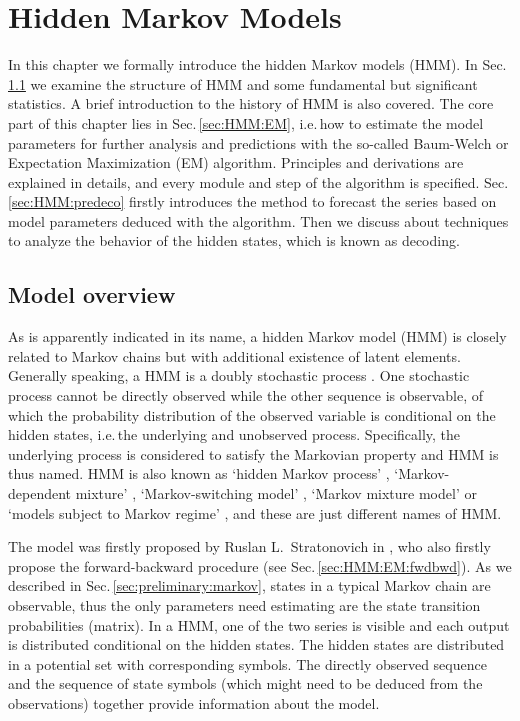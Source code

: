 
\chapter{Hidden Markov Models}
\label{chap:HMM}

In this chapter we formally introduce the hidden Markov models (HMM).
In Sec.\,\ref{sec:HMM:overview} we examine the structure of HMM and 
some fundamental but significant statistics.
A brief introduction to the history of HMM is also covered.
The core part of this chapter lies in Sec.\,\ref{sec:HMM:EM},
i.e.\,how to estimate the model parameters for further analysis and predictions 
with the so-called Baum-Welch or Expectation Maximization (EM) algorithm.
Principles and derivations are explained in details, 
and every module and step of the algorithm is specified.
Sec.\,\ref{sec:HMM:predeco} firstly introduces the method to forecast the series 
based on model parameters deduced with the algorithm.
Then we discuss about techniques to analyze the behavior of the hidden states,
which is known as decoding.


\section{Model overview}
\label{sec:HMM:overview}
As is apparently indicated in its name, 
a hidden Markov model (HMM) is closely related to Markov chains but
with additional existence of latent elements.
Generally speaking, a HMM is a doubly stochastic process \cite{Rabiner:1986jk}.
One stochastic process cannot be directly observed while
the other sequence is observable,
of which the probability distribution of the observed variable is 
conditional on the hidden states,
i.e.\,the underlying and unobserved process.
Specifically, the underlying process is considered to satisfy the Markovian property
and HMM is thus named.
HMM is also known as `hidden Markov process' \cite{Ephraim:2002ju},
`Markov-dependent mixture' \cite{Leroux:1992ma},
`Markov-switching model' \cite{Haas:2004ek},
`Markov mixture model' or `models subject to Markov regime' \cite{Zucchini:2009df},
and these are just different names of HMM.

The model was firstly proposed by Ruslan L.~Stratonovich in \cite{Stratonovich:1960vh},
who also firstly propose the forward-backward procedure (see Sec.\,\ref{sec:HMM:EM:fwdbwd}).
As we described in Sec.\,\ref{sec:preliminary:markov},
states in a typical Markov chain are observable,
thus the only parameters need estimating are the state transition probabilities (matrix).
In a HMM, one of the two series is visible and 
each output is distributed conditional on the hidden states.
The hidden states are distributed in a potential set with corresponding symbols.
The directly observed sequence and the sequence of state symbols 
(which might need to be deduced from the observations)
together provide information about the model.

